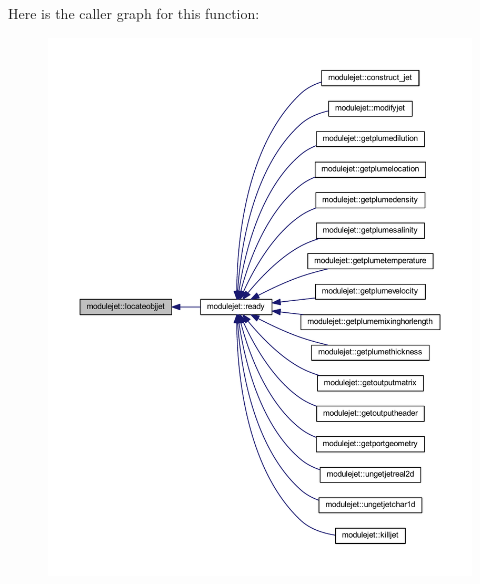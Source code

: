 Here is the caller graph for this function\+:\nopagebreak
\begin{figure}[H]
\begin{center}
\leavevmode
\includegraphics[width=350pt]{namespacemodulejet_a0b2668a76b18f69741deda8796740f8f_icgraph}
\end{center}
\end{figure}
\mbox{\label{namespacemodulejet_aabae5c457f7fe1dd3d3f540d56e94877}} 
